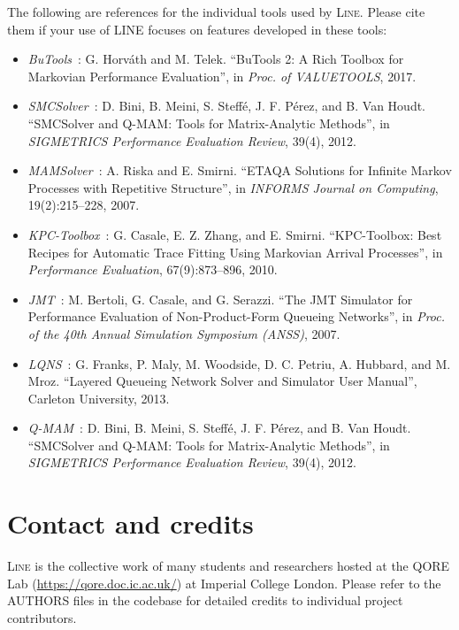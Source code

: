 \noindent The following are references for the individual tools used by \textsc{Line}. Please cite them if your use of LINE focuses on features developed in these tools:
\begin{itemize}
\item \textit{BuTools}~\cite{Hor17}: G. Horv\'ath and M. Telek. ``BuTools 2: A Rich Toolbox for Markovian Performance Evaluation'', in {\em Proc. of VALUETOOLS}, 2017.
\item \textit{SMCSolver}~\cite{BiniMSPH12}: D. Bini, B. Meini, S. Steff\'e, J. F. P\'erez, and B. Van Houdt. ``SMCSolver and Q-MAM: Tools for Matrix-Analytic Methods'', in {\em SIGMETRICS Performance Evaluation Review}, 39(4), 2012.
\item \textit{MAMSolver}~\cite{RisS07}: A. Riska and E. Smirni. ``ETAQA Solutions for Infinite Markov Processes with Repetitive Structure'', in {\em INFORMS Journal on Computing}, 19(2):215--228, 2007.
\item \textit{KPC-Toolbox}~\cite{CasZS10}: G. Casale, E. Z. Zhang, and E. Smirni. ``KPC-Toolbox: Best Recipes for Automatic Trace Fitting Using Markovian Arrival Processes'', in {\em Performance Evaluation}, 67(9):873--896, 2010.
\item \textit{JMT}~\cite{BerCS07}: M. Bertoli, G. Casale, and G. Serazzi. ``The JMT Simulator for Performance Evaluation of Non-Product-Form Queueing Networks'', in {\em Proc. of the 40th Annual Simulation Symposium (ANSS)}, 2007.
\item \textit{LQNS}~\cite{lqns13}: G. Franks, P. Maly, M. Woodside, D. C. Petriu, A. Hubbard, and M. Mroz. ``Layered Queueing Network Solver and Simulator User Manual'', Carleton University, 2013.
\item \textit{Q-MAM}~\cite{BiniMSPH12}: D. Bini, B. Meini, S. Steff\'e, J. F. P\'erez, and B. Van Houdt. ``SMCSolver and Q-MAM: Tools for Matrix-Analytic Methods'', in {\em SIGMETRICS Performance Evaluation Review}, 39(4), 2012.
\end{itemize}


\section{Contact and credits}

\noindent \textsc{Line} is the collective work of many students and researchers hosted at the QORE Lab (\url{https://qore.doc.ic.ac.uk/}) at Imperial College London. Please refer to the AUTHORS files in the codebase for detailed credits to individual project contributors.

